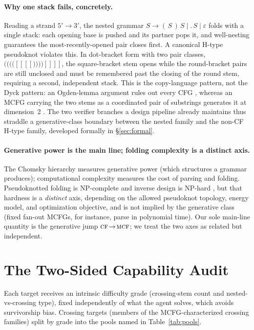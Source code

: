 \documentclass[11pt]{article}
\newcommand{\CF}{\textsc{cf}}
\newcommand{\MCF}{\textsc{mcf}}
\begin{document}
\paragraph{Why one stack fails, concretely.} Reading a strand $5'\!\to\!3'$, the nested grammar
$S\to(\,S\,)\,S\mid\mathord{.}\,S\mid\varepsilon$ folds with a single stack: each opening base is pushed and
its partner pops it, and well-nesting guarantees the most-recently-opened pair closes first. A canonical
H-type pseudoknot violates this. In dot-bracket form with two pair classes, $(((([[[[))))]]]]$, the
square-bracket stem opens while the round-bracket pairs are still unclosed and must be remembered past the
closing of the round stem, requiring a second, independent stack. This is the copy-language pattern, not the
Dyck pattern: an Ogden-lemma argument rules out every CFG \citep{nebelweinberg}, whereas an MCFG carrying the
two stems as a coordinated pair of substrings generates it at dimension~2 \citep{katosekikasami2006}. The two
verifier branches a design pipeline already maintains thus straddle a generative-class boundary between the
nested family and the non-CF H-type family, developed formally in \S\ref{sec:formal}.

\paragraph{Generative power is the main line; folding complexity is a distinct axis.} The Chomsky hierarchy
measures generative power (which structures a grammar produces); computational complexity measures the cost of
parsing and folding. Pseudoknotted folding is NP-complete and inverse design is NP-hard
\citep{lyngso2000pknot,bonnet2020hard}, but that hardness is a \emph{distinct} axis, depending on the
allowed pseudoknot topology, energy model, and optimization objective, and is not implied by the generative
class (fixed fan-out MCFGs, for instance, parse in polynomial time). Our sole main-line quantity is the
generative jump $\CF\!\to\!\MCF$; we treat the two axes as related but independent.
\section{The Two-Sided Capability Audit}\label{sec:cert}
Each target receives an intrinsic difficulty grade (crossing-stem count and nested-vs-crossing type), fixed
independently of what the agent solves, which avoids survivorship bias. Crossing targets (members of the MCFG-characterized crossing families) split by
grade into the pools named in Table~\ref{tab:pools}.
\end{document}
